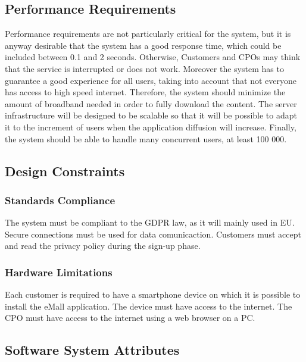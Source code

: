 \subsection{Performance Requirements}

Performance requirements are not particularly critical for the system, but it is anyway desirable that the system has a good response time, which could be included between 0.1 and 2 seconds.
Otherwise, Customers and CPOs may think that the service is interrupted or does not work.
Moreover the system has to guarantee a good experience for all users, taking into account that not everyone has access to high speed internet. Therefore,
the system should minimize the amount of broadband needed in order to fully
download the content.
The server infrastructure will be designed to be scalable so that it will be possible to adapt it to
the increment of users when the application diffusion will increase.
Finally, the system should be able to handle many concurrent users, at least
100 000.
\subsection{Design Constraints}
\subsubsection{Standards Compliance}

The system must be compliant to the GDPR law, as it will mainly used in EU. \newline
Secure connections must be used for data comunicaction. \newline
Customers must accept and read the privacy policy during the sign-up phase.

\subsubsection{Hardware Limitations}

Each customer is required to have a smartphone device on which it is possible to install the eMall application. The device must have access to the internet. \newline
The CPO must have access to the internet using a web browser on a PC.  



\subsection{Software System Attributes}

